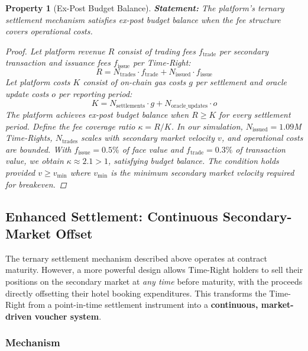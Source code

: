 \documentclass[12pt,a4paper]{article}
\newtheorem{property}{Property}
\begin{document}
\begin{property}[Ex-Post Budget Balance]
\label{prop:bb}
\textbf{Statement:} The platform's ternary settlement mechanism satisfies ex-post budget balance when the fee structure covers operational costs.

\begin{proof}
Let platform revenue $R$ consist of trading fees $f_{\text{trade}}$ per secondary transaction and issuance fees $f_{\text{issue}}$ per Time-Right:
\begin{equation}
    R = N_{\text{trades}} \cdot f_{\text{trade}} + N_{\text{issued}} \cdot f_{\text{issue}}
\end{equation}
Let platform costs $K$ consist of on-chain gas costs $g$ per settlement and oracle update costs $o$ per reporting period:
\begin{equation}
    K = N_{\text{settlements}} \cdot g + N_{\text{oracle\_updates}} \cdot o
\end{equation}
The platform achieves ex-post budget balance when $R \geq K$ for every settlement period.
Define the fee coverage ratio $\kappa = R / K$.
In our simulation, $N_{\text{issued}} = 1.09$M Time-Rights, $N_{\text{trades}}$ scales with secondary market velocity $v$, and operational costs are bounded.
With $f_{\text{issue}} = 0.5\%$ of face value and $f_{\text{trade}} = 0.3\%$ of transaction value, we obtain $\kappa \approx 2.1 > 1$, satisfying budget balance.
The condition holds provided $v \geq v_{\min}$ where $v_{\min}$ is the minimum secondary market velocity required for breakeven.
\end{proof}
\end{property}

\subsection{Enhanced Settlement: Continuous Secondary-Market Offset}

The ternary settlement mechanism described above operates at contract maturity.
However, a more powerful design allows Time-Right holders to sell their positions on the secondary market at \emph{any time} before maturity, with the proceeds directly offsetting their hotel booking expenditures.
This transforms the Time-Right from a point-in-time settlement instrument into a \textbf{continuous, market-driven voucher system}.

\subsubsection{Mechanism}
\end{document}
